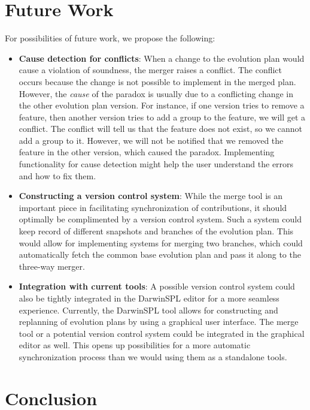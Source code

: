 \documentclass[a4paper,english]{ifimaster}
\begin{document}
\section{Future Work}%
\label{sec:future_work}

For possibilities of future work, we propose the following:

\begin{itemize}
  \item \textbf{Cause detection for conflicts}: When a change to the evolution plan would cause a violation of soundness, the merger raises a conflict. The conflict occurs because the change is not possible to implement in the merged plan. However, the \textit{cause} of the paradox is usually due to a conflicting change in the other evolution plan version. For instance, if one version tries to remove a feature, then another version tries to add a group to the feature, we will get a conflict. The conflict will tell us that the feature does not exist, so we cannot add a group to it. However, we will not be notified that we removed the feature in the other version, which caused the paradox. Implementing functionality for cause detection might help the user understand the errors and how to fix them.
  \item \textbf{Constructing a version control system}: While the merge tool is an important piece in facilitating synchronization of contributions, it should optimally be complimented by a version control system. Such a system could keep record of different snapshots and branches of the evolution plan. This would allow for implementing systems for merging two branches, which could automatically fetch the common base evolution plan and pass it along to the three-way merger.
  \item \textbf{Integration with current tools}: A possible version control system could also be tightly integrated in the DarwinSPL editor for a more seamless experience. Currently, the DarwinSPL tool allows for constructing and replanning of evolution plans by using a graphical user interface. The merge tool or a potential version control system could be integrated in the graphical editor as well. This opens up possibilities for a more automatic synchronization process than we would using them as a standalone tools.
\end{itemize}

\section{Conclusion}%
\label{sec:conclusion}
\end{document}

